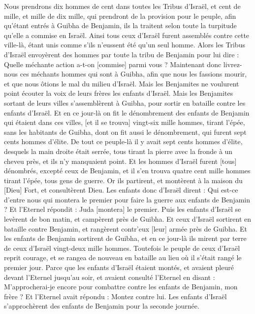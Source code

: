 \begin{multicols}{2}
Nous prendrons dix hommes de cent dans toutes les Tribus d'Israël, et cent de mille, et mille de dix mille, qui prendront de la provision pour le peuple, afin qu'étant entrés à Guibha de Benjamin, ils la traitent selon toute la turpitude qu'elle a commise en Israël.
Ainsi tous ceux d'Israël furent assemblés contre cette ville-là, étant unis comme s'ils n'eussent été qu'un seul homme.
Alors les Tribus d'Israël envoyèrent des hommes par toute la tribu de Benjamin pour lui dire : Quelle méchante action a-t-on [commise] parmi vous ?
Maintenant donc livrez-nous ces méchants hommes qui sont à Guibha, afin que nous les fassions mourir, et que nous ôtions le mal du milieu d'Israël. Mais les Benjamites ne voulurent point écouter la voix de leurs frères les enfants d'Israël.
Mais les Benjamites sortant de leurs villes s'assemblèrent à Guibha, pour sortir en bataille contre les enfants d'Israël.
Et en ce jour-là on fit le dénombrement des enfants de Benjamin qui étaient dans ces villes, [et il se trouva] vingt-six mille hommes, tirant l'épée, sans les habitants de Guibha, dont on fit aussi le dénombrement, qui furent sept cents hommes d'élite.
De tout ce peuple-là il y avait sept cents hommes d'élite, desquels la main droite était serrée, tous tirant la pierre avec la fronde à un cheveu près, et ils n'y manquaient point.
Et les hommes d'Israël furent [tous] dénombrés, excepté ceux de Benjamin, et il s'en trouva quatre cent mille hommes tirant l'épée, tous gens de guerre.
Or ils partirent, et montèrent à la maison du [Dieu] Fort, et consultèrent Dieu. Les enfants donc d'Israël dirent : Qui est-ce d'entre nous qui montera le premier pour faire la guerre aux enfants de Benjamin ? Et l'Eternel répondit : Juda [montera] le premier.
Puis les enfants d'Israël se levèrent de bon matin, et campèrent près de Guibha.
Et ceux d'Israël sortirent en bataille contre Benjamin, et rangèrent contr'eux [leur] armée près de Guibha.
Et les enfants de Benjamin sortirent de Guibha, et en ce jour-là ils mirent par terre de ceux d'Israël vingt-deux mille hommes.
Toutefois le peuple de ceux d'Israël reprit courage, et se rangea de nouveau en bataille au lieu où il s'était rangé le premier jour.
Parce que les enfants d'Israël étaient montés, et avaient pleuré devant l'Eternel jusqu'au soir, et avaient consulté l'Eternel en disant : M'approcherai-je encore pour combattre contre les enfants de Benjamin, mon frère ? Et l'Eternel avait répondu : Montez contre lui.
Les enfants d'Israël s'approchèrent des enfants de Benjamin pour la seconde journée.

\end{multicols}
